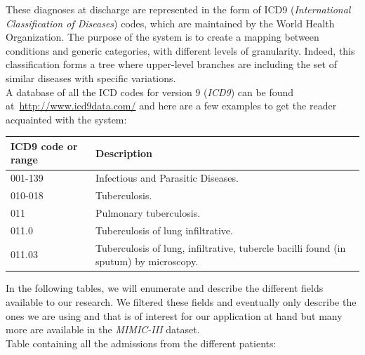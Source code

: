 These diagnoses at discharge are represented in the form of ICD9 (\textit{International Classification of Diseases}) codes, which are maintained by the World Health Organization. The purpose of the system is to create a mapping between conditions and generic categories, with different levels of granularity. Indeed, this classification forms a tree where upper-level branches are including the set of similar diseases with specific variations. \\

\newpage
A database of all the ICD codes for version 9 (\textit{ICD9}) can be found at~\url{http://www.icd9data.com/} and here are a few examples to get the reader acquainted with the system:

\begin{table}[H]
 \begin{center}
  \begin{tabular}{ l | p{7cm} }
   \textbf{ICD9 code or range} & \textbf{Description} \\ \hline
   001-139 & Infectious and Parasitic Diseases. \\ \hline
   010-018 & Tuberculosis. \\ \hline
   011 & Pulmonary tuberculosis. \\ \hline
   011.0 & Tuberculosis of lung infiltrative. \\ \hline
   011.03 & Tuberculosis of lung, infiltrative, tubercle bacilli found (in sputum) by microscopy. \\
   \hline
  \end{tabular}
 \end{center}
\end{table}

In the following tables, we will enumerate and describe the different fields available to our research. We filtered these fields and eventually only describe the ones we are using and that is of interest for our application at hand but many more are available in the \textit{MIMIC-III} dataset. \\

Table containing all the admissions from the different patients:

